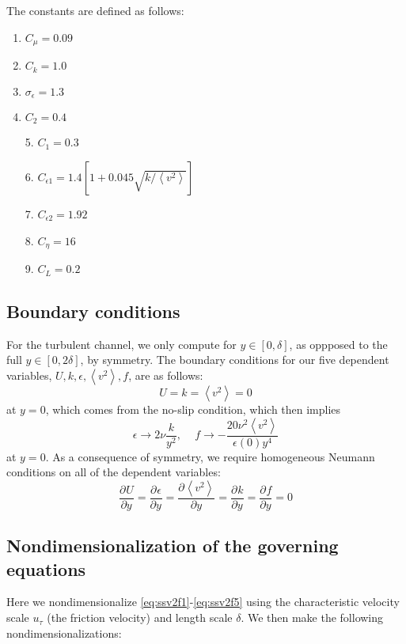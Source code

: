 \documentclass[a4paper,11pt]{article}
\newcommand{\chevron}[1]{\left\langle #1 \right\rangle}
\newcommand{\pderiv}[3][]{%
  \ensuremath{\frac{\partial^{#1} {#2}}{\partial {#3}^{#1}}}}
\newcommand{\ep}{\epsilon}
\begin{document}
The constants are defined as follows: 
\begin{multicols}{2}
\begin{enumerate}
	\item $C_\mu = 0.09$
        \item $C_k = 1.0$
	\item $\sigma_\ep = 1.3$
	\item $C_2 = 0.4$	
\end{enumerate}
\columnbreak 

\begin{itemize}
	\item[5.] $C_1 = 0.3$
	\item[6.] $C_{\ep 1} = 1.4[1 + 0.045 \sqrt{k/\chevron{v^2}}]$
	\item[7.] $C_{\ep 2} = 1.92$  
	\item[8.] $C_\eta = 16$
	\item[9.] $C_L = 0.2$
\end{itemize}
\end{multicols}

\subsection{Boundary conditions}
For the turbulent channel, we only compute for $y \in [0,\delta] $, as oppposed to the full $y \in [0,2\delta]$, by symmetry. The boundary conditions for our five dependent variables, $U, k, \ep, \chevron{v^2}, f$, are as follows: 
\[
U = k = \chevron{v^2} = 0 
\]
at $y = 0$, which comes from the no-slip condition, which then implies 
\[
\epsilon \to 2\nu \frac{k}{y^2}, \,\,\,\,\,\,\, f \to -\frac{20 \nu^2 \chevron{v^2} }{\ep(0) y^4}
\]
at $y = 0$. As a consequence of symmetry, we require homogeneous Neumann conditions on all of the dependent variables: 
\[
\pderiv{U}{y}= \pderiv{\ep}{y} = \pderiv{\chevron{v^2}}{y} = \pderiv{k}{y} = \pderiv{f}{y} = 0
\] 

\subsection{Nondimensionalization of the governing equations}
Here we nondimensionalize \eqref{eq:ssv2f1}-\eqref{eq:ssv2f5} using the characteristic velocity scale $u_{\tau}$ (the friction velocity) and length scale $\delta$. We then make the following nondimensionalizations:
\end{document}
